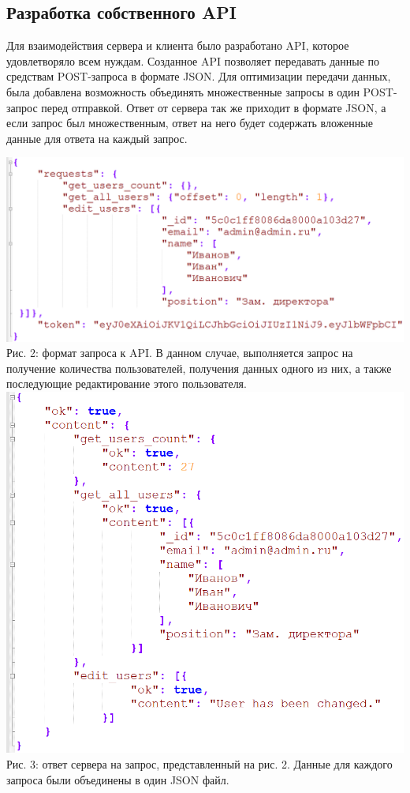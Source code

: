 \documentclass[14pt, a4paper]{extarticle}
\begin{document}
    \subsection{Разработка собственного API}
    Для взаимодействия сервера и клиента было разработано API, которое удовлетворяло всем нуждам. Созданное API позволяет передавать данные по средствам POST-запроса в формате JSON. Для оптимизации передачи данных, была добавлена возможность объединять множественные запросы в один POST-запрос перед отправкой. Ответ от сервера так же приходит в формате JSON, а если запрос был множественным, ответ на него будет содержать вложенные данные для ответа на каждый запрос.
    \begin{center}
        \includegraphics[width=\textwidth]{img/req.png}\\
        Рис. 2: формат запроса к API. В данном случае, выполняется запрос на получение количества пользователей, получения данных одного из них, а также последующие редактирование этого пользователя.\\[\baselineskip]
        \includegraphics[scale=0.5]{img/ans.png}\\
        Рис. 3: ответ сервера на запрос, представленный на рис. 2. Данные для каждого запроса были объединены в один JSON файл.\\[\baselineskip]
    \end{center}
\end{document}
